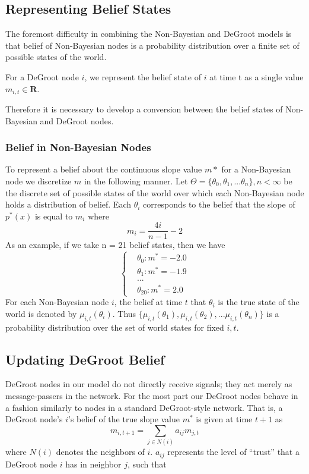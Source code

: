 \documentclass[a4paper,12pt]{article}
\begin{document}
\subsection{Representing Belief States}

The foremost difficulty in combining the Non-Bayesian and DeGroot models is that belief of Non-Bayesian nodes is a probability distribution over a finite set of possible states of the world.

For a DeGroot node $i$, we represent the belief state of $i$ at time t as a single value 
$m_{i,t} \in \mathbf{R}$.



Therefore it is necessary to develop a conversion between the belief states of Non-Bayesian and DeGroot nodes.


\subsubsection{Belief in Non-Bayesian Nodes}

To represent a belief about the continuous slope value $m*$ for a Non-Bayesian node we discretize $m$ in the following manner.  Let $\Theta = \{\theta_0, \theta_1,...\theta_n\}, n < \infty$ be the discrete set of possible states of the world over which each Non-Bayesian node holds a distribution of belief. Each $\theta_i$ corresponds to the belief that the slope of $p^*(x)$ is equal to $m_i$ where
\begin{equation}
\label{eq:theta_meaning}
m_i = \frac{4i}{n - 1} - 2
\end{equation}
As an example, if we take n = 21 belief states, then we have
\begin{equation}
\nonumber
\begin{cases}
& \theta_0: m^* = -2.0 \\
& \theta_1: m^* = -1.9 \\
& ... \\
& \theta_{20}: m^* = 2.0
\end{cases}
\end{equation}
For each Non-Bayesian node $i$, the belief at time $t$ that $\theta_i$ is the true state of the world is denoted by $\mu_{i,t}(\theta_i)$.  Thus $\{ \mu_{i,t}(\theta_1), \mu_{i,t}(\theta_2), ... \mu_{i,t}(\theta_n) \}$ is a probability distribution over the set of world states for fixed $i,t$.

\subsection{Updating DeGroot Belief}
DeGroot nodes in our model do not directly receive signals; they act merely as message-passers in the network.  For the most part our DeGroot nodes behave in a fashion similarly to nodes in a standard DeGroot-style network.  That is, a DeGroot node's $i$'s belief of the true slope value $m^*$ is given at time $t+1$ as
\begin{equation}
\label{eq:degroot_update}
m_{i,t+1} = \sum_{j \in N(i)} a_{ij}m_{j,t}
\end{equation}
where $N(i)$ denotes the neighbors of $i$.  $a_{ij}$ represents the level of ``trust'' that a DeGroot node $i$ has in neighbor $j$, such that
\end{document}
